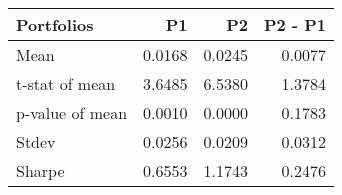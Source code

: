 \begin{tabular}{lrrr}
\toprule
Portfolios & P1 & P2 & P2 - P1 \\
\midrule
Mean & 0.0168 & 0.0245 & 0.0077 \\
t-stat of mean & 3.6485 & 6.5380 & 1.3784 \\
p-value of mean & 0.0010 & 0.0000 & 0.1783 \\
Stdev & 0.0256 & 0.0209 & 0.0312 \\
Sharpe & 0.6553 & 1.1743 & 0.2476 \\
\bottomrule
\end{tabular}
